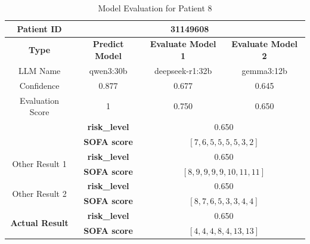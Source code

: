 \begin{table}[htbp]
 \centering
 \caption{Model Evaluation for Patient 8}
 \label{tab:patient8}
 \begin{tabular}{cccc}
 \toprule
 \textbf{ Patient ID } & \multicolumn{3}{c}{31149608} \\
 \midrule
 \textbf{ Type } & \textbf{ Predict Model } & \textbf{ Evaluate Model 1 } & \textbf{ Evaluate Model 2 } \\
 LLM Name & qwen3:30b & deepseek-r1:32b & gemma3:12b \\
 Confidence & 0.877 & 0.677 & 0.645 \\
 Evaluation Score & 1 & 0.750 & 0.650 \\
 \midrule
 \addlinespace
 \multirow{2}{*}{\textbf{ Best Result }} & \textbf{ risk\_level } & \multicolumn{2}{c}{0.650} \\
      & \textbf{ SOFA score } & \multicolumn{2}{c}{$[7, 6, 5, 5, 5, 5, 3, 2]$} \\
 \midrule
 \multirow{2}{*}{Other Result 1} & \textbf{ risk\_level } & \multicolumn{2}{c}{0.650} \\
      & \textbf{ SOFA score } & \multicolumn{2}{c}{$[8, 9, 9, 9, 9, 10, 11, 11]$} \\
 \midrule
 \multirow{2}{*}{Other Result 2} & \textbf{ risk\_level } & \multicolumn{2}{c}{0.650} \\
      & \textbf{ SOFA score } & \multicolumn{2}{c}{$[8, 7, 6, 5, 3, 3, 4, 4]$} \\
 \midrule
 \multirow{2}{*}{\textbf{ Actual Result }} & \textbf{ risk\_level } & \multicolumn{2}{c}{0.650} \\
      & \textbf{ SOFA score } & \multicolumn{2}{c}{$[4, 4, 4, 8, 4, 13, 13]$} \\
 \bottomrule
 \end{tabular}
\end{table}

